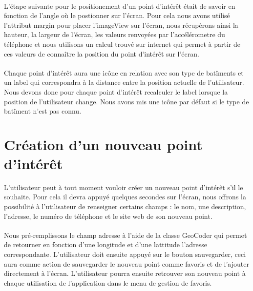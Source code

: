 \begin{onehalfspace}
    
    \paragraph{}
    L'étape suivante pour le positionement d'un point d'intérêt était de savoir en fonction de l'angle où le postionner sur l'écran. Pour cela nous 
    avons utilisé l'attribut margin pour placer l'imageView sur l'écran, nous récupèrons ainsi la hauteur, la largeur de l'écran, les valeurs renvoyées
    par l'accélérometre du téléphone et nous utilisons un calcul trouvé sur internet qui permet à partir de ces valeurs de connaître la position du point d'intérêt
    sur l'écran.
    
    \paragraph{}
    Chaque point d'intérêt aura une icône en relation avec son type de batîments et un label qui correspondra à la distance entre la position actuelle 
    de l'utilisateur. Nous devons donc pour chaque point d'intérêt recalculer le label lorsque la position de l'utilisateur change. Nous avons mis une
    icône par défaut si le type de batîment n'est pas connu.
    
    
    \section*{Création d'un nouveau point d'intérêt}

    \paragraph{}
    L'utilisateur peut à tout moment vouloir créer un nouveau point d'intérêt s'il le souhaite. Pour cela il devra appuyé quelques secondes sur l'écran,
    nous offrons la possibilité à l'utilisateur de renseigner certains champs : le nom, une description, l'adresse, le numéro de téléphone et le site 
    web de son nouveau point.
    
    \paragraph{}
    Nous pré-remplissons le champ adresse à l'aide de la classe GeoCoder qui permet de retourner en fonction d'une longitude
    et d'une lattitude l'adresse correspondante. L'utilisateur doit ensuite appuyé sur le bouton sauvegarder, ceci aura comme action de sauvegarder le 
    nouveau point comme favoris et de l'ajouter directement à l'écran. L'utilisateur pourra ensuite retrouver son nouveau point à chaque utilisation 
    de l'application dans le menu de gestion de favoris.
    

\end{onehalfspace}
